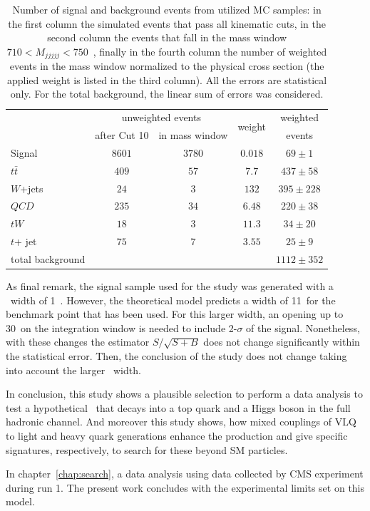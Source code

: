 \begin{table}[tb]
\begin{center}
\begin{tabular}{l|c|c|c|c}
 & \multicolumn{2}{c|}{unweighted events}  & \multirow{2}{*}{weight} & weighted  \\
 & after Cut 10 & in mass window & & events \\
 \hline
 Signal & $8601$ & $3780$ & $0.018$ &$69 \pm 1$ \\
 \hline
   $t \bar{t}$ & $409$ & $57$ & $7.7$ & $437 \pm 58$ \\
 $W$+jets & $24$ & $3$ & $132$ & $395 \pm 228$ \\
 $QCD$ & $235$ & $34$ & $6.48$ & $220 \pm 38$ \\
 $tW$ & $18$ & $3$ & $11.3$ & $34 \pm 20$ \\
 $t$+ jet & $75$ & $7$ & $3.55$ & $25 \pm 9$ \\
  \hline
  total background & & & & $1112 \pm 352$ \\
\end{tabular}
\caption{Number of signal and background events from utilized MC samples: in the first column the simulated events that pass all kinematic cuts, in the second column the events that fall in the mass window ${710<M_{jjjjj}<750}$~\GeVcc, finally in the fourth column the number of weighted events in the mass window normalized to the physical cross section (the applied weight is listed in the third column). All the errors are statistical only. For the total background, the linear sum of errors was considered.} \label{tab:events} 
\end{center}
\end{table}

As final remark, the signal sample used for the study was generated with a \Tp~width of 1~\GeVcc. However, the theoretical model predicts a width of 11~\GeVcc for the benchmark point that has been used. For this larger width, an opening up to 30~\GeVcc on the integration window is needed to include 2-$\sigma$ of the signal. Nonetheless, with these changes the estimator $S/\sqrt{S+B}$ does not change significantly within the statistical error. Then, the conclusion of the study does not change taking into account the larger \Tp~width.

In conclusion, this study shows a plausible selection to perform a data analysis to test a hypothetical \Tp~that decays into a top quark and a Higgs boson in the full hadronic channel. And moreover this study shows, how mixed couplings of VLQ to light and heavy quark generations enhance the production and give specific signatures, respectively, to search for these beyond SM particles. 

In chapter~\ref{chap:search}, a data analysis using data collected by CMS experiment during run 1. The present work concludes with the experimental limits set on this model.

